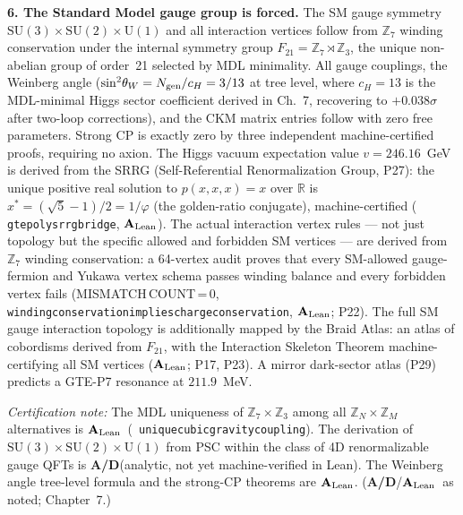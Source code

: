\documentclass[11pt,openany]{book}
\theoremstyle{remark}
\newcommand{\ZS}{\mathbb{Z}_7}
\newcommand{\lean}[1]{%
  \penalty-100
  \begingroup\def\_{\textunderscore\allowbreak}\texttt{#1}\endgroup}
\newcommand{\CatAL}{\ensuremath{\textbf{A}_{\rm Lean}}}
\newcommand{\CatAD}{\textbf{A/D}}
\begin{document}
\textbf{6. The Standard Model gauge group is forced.}
The SM gauge symmetry $\mathrm{SU}(3)\times\mathrm{SU}(2)\times\mathrm{U}(1)$
and all interaction vertices follow from $\mathbb{Z}_7$ winding conservation
under the internal symmetry group $F_{21} = \mathbb{Z}_7\rtimes\mathbb{Z}_3$,
the unique non-abelian group of order~21 selected by MDL minimality.
All gauge couplings, the Weinberg angle ($\sin^2\!\theta_W = N_{\rm gen}/c_H = 3/13$
at tree level, where $c_H = 13$ is the MDL-minimal Higgs sector coefficient derived
in Ch.~7, recovering to $+0.038\sigma$ after two-loop corrections), and the CKM
matrix entries follow with zero free parameters.
Strong CP is exactly zero by three independent machine-certified proofs,
requiring no axion.
The Higgs vacuum expectation value $v = 246.16$~GeV is derived from the SRRG
(Self-Referential Renormalization Group, P27): the unique positive real
solution to $p(x,x,x)=x$ over $\mathbb{R}$ is
$x^* = (\sqrt{5}-1)/2 = 1/\varphi$ (the golden-ratio conjugate),
machine-certified (\lean{gte\_poly\_srrg\_bridge}, \CatAL).
The actual interaction vertex rules --- not just topology but the
specific allowed and forbidden SM vertices --- are derived from
$\mathbb{Z}_7$ winding conservation: a 64-vertex audit proves that every
SM-allowed gauge-fermion and Yukawa vertex schema passes winding balance
and every forbidden vertex fails (MISMATCH\,COUNT\,=\,0,
\lean{winding\_conservation\_implies\_charge\_conservation}, \CatAL; P22).
The full SM gauge interaction topology is additionally mapped by the
Braid Atlas: an atlas of cobordisms derived from $F_{21}$, with the
Interaction Skeleton Theorem machine-certifying all SM vertices
(\CatAL; P17, P23).
A mirror dark-sector atlas (P29) predicts a GTE-P7 resonance at
$211.9$~MeV.

\textit{Certification note:} The MDL uniqueness of $\ZS\times\mathbb{Z}_3$ among all
$\mathbb{Z}_N\times\mathbb{Z}_M$ alternatives is \CatAL\
\mbox{(\lean{unique\_cubic\_gravity\_coupling})}.  The derivation of
$\mathrm{SU}(3)\times\mathrm{SU}(2)\times\mathrm{U}(1)$ from PSC within the class of
4D renormalizable gauge QFTs is \CatAD (analytic, not yet machine-verified in Lean).
The Weinberg angle tree-level formula and the strong-CP theorems are \CatAL.
(\CatAD/\CatAL\ as noted; Chapter~7.)
\end{document}
